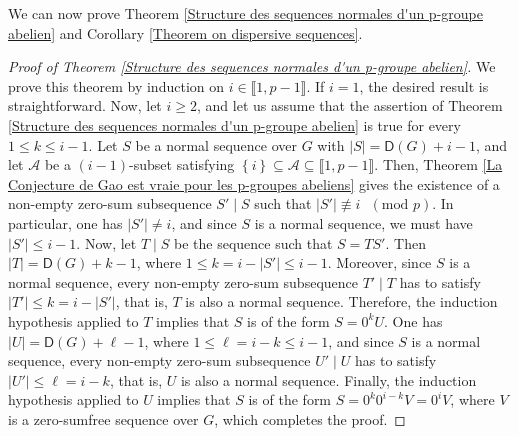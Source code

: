 \documentclass[english,12pt,a4paper,twoside]{smfart}
\theoremstyle{plain}
\theoremstyle{definition}
\theoremstyle{remark}
\begin{document}
We can now prove Theorem \ref{Structure des sequences normales d'un p-groupe abelien} and Corollary \ref{Theorem on dispersive sequences}.
\begin{proof}[Proof of Theorem \ref{Structure des sequences normales d'un p-groupe abelien}] We prove this theorem by induction on $i \in \llbracket 1,p-1 \rrbracket$. If $i=1$, the desired result is straightforward. Now, let $i \geq 2$, and let us assume that the assertion of Theorem \ref{Structure des sequences normales d'un p-groupe abelien} is true for every $1 \leq k \leq i-1$. Let $S$ be a normal sequence over $G$ with $\left|S\right|=\mathsf{D}(G)+i-1$, and let $\mathcal{A}$ be a $(i-1)$-subset satisfying $\left\{i\right\} \subseteq \mathcal{A} \subseteq \llbracket 1,p-1 \rrbracket$. Then, Theorem \ref{La Conjecture de Gao est vraie pour les p-groupes abeliens} gives the existence of a non-empty zero-sum subsequence $S' \mid S$ such that $\left|S'\right| \not\equiv i \text{ } (\text{mod } p)$. In particular, one has $\left|S'\right| \neq i$, and since $S$ is a normal sequence, we must have $\left|S'\right| \leq i-1$. Now, let $T \mid S$ be the sequence such that $S=TS'$. Then $\left|T\right|=\mathsf{D}(G)+ k - 1$, where $1 \leq k = i-\left|S'\right| \leq i-1$. Moreover, since $S$ is a normal sequence, every non-empty zero-sum subsequence $T' \mid T$ has to satisfy $\left|T'\right| \leq k = i-\left|S'\right|$, that is, $T$ is also a normal sequence. Therefore, the induction hypothesis applied to $T$ implies that $S$ is of the form $S=0^kU$. One has $\left|U\right|=\mathsf{D}(G)+ \ell - 1$, where $1 \leq \ell = i-k \leq i-1$, and since $S$ is a normal sequence, every non-empty zero-sum subsequence $U' \mid U$ has to satisfy $\left|U'\right| \leq \ell = i-k$, that is, $U$ is also a normal sequence. Finally, the induction hypothesis applied to $U$ implies that $S$ is of the form $S=0^k0^{i-k}V=0^iV$, where $V$ is a zero-sumfree sequence over $G$, which completes the proof.   
\end{proof}
\end{document}
